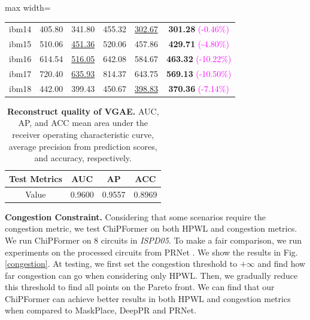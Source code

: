 \documentclass{article}
\theoremstyle{plain}
\theoremstyle{definition}
\theoremstyle{remark}
\begin{document}
\begin{table}[!htb]
\begin{center}
\begin{adjustbox}{max width=\columnwidth}
\begin{tabular}{cccccc}
				ibm14 & 405.80 & 341.80 & 455.32 & \underline{302.67} & \textbf{301.28} \textcolor{magenta}{\scriptsize{(-0.46\%)}}\\
				ibm15 & 510.06 & \underline{451.36} & 520.06 & 457.86 & \textbf{429.71} \textcolor{magenta}{\scriptsize{(-4.80\%)}}\\
				ibm16 & 614.54 & \underline{516.05} & 642.08 & 584.67 & \textbf{463.32} \textcolor{magenta}{\scriptsize{(-10.22\%)}}\\
				ibm17 & 720.40 & \underline{635.93} & 814.37 & 643.75 & \textbf{569.13} \textcolor{magenta}{\scriptsize{(-10.50\%)}} \\
				ibm18 & 442.00 & 399.43 & 450.67 & \underline{398.83} & \textbf{370.36} \textcolor{magenta}{\scriptsize{(-7.14\%)}} \\
				\bottomrule
			\end{tabular}
		\end{adjustbox}
	\end{center}
\end{table}

\begin{table}[!htb]
	\caption{\textbf{Reconstruct quality of VGAE.} AUC, AP, and ACC mean area under the receiver operating characteristic curve, average precision from prediction scores, and accuracy, respectively.}
	\label{reconstruct}
	\begin{center}
			\begin{tabular}{cccc}
   \toprule
                    Test Metrics & AUC & AP & ACC \\
                    \midrule
                    Value & 0.9600 & 0.9557 & 0.8969 \\
				\bottomrule
			\end{tabular}
	\end{center}
\end{table}


\textbf{Congestion Constraint.} 
Considering that some scenarios require the congestion metric, we test ChiPFormer on both HPWL and congestion metrics. We run ChiPFormer on 8 circuits in \textit{ISPD05}. To make a fair comparison, we run experiments on the processed circuits from PRNet \cite{chengpolicy}. 
We show the results in Fig.\ref{congestion}. At testing, we first set the congestion threshold to $+\infty$ and find how far congestion can go when considering only HPWL. Then, we gradually reduce this threshold to find all points on the Pareto front. We can find that our ChiPFormer can achieve better results in both HPWL and congestion metrics when compared to MaskPlace, DeepPR and PRNet. 
\end{document}
